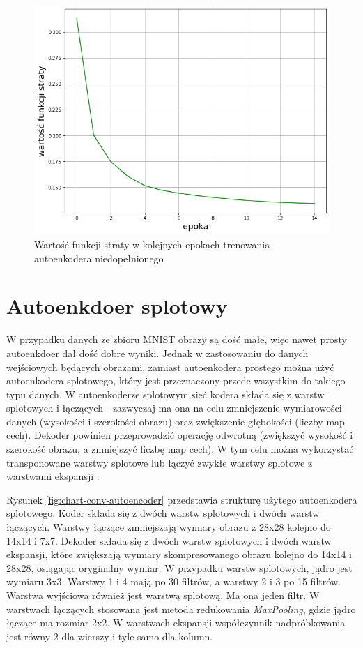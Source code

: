 \documentclass[12pt]{mwbk}
\theoremstyle{plain}
\theoremstyle{definition}
\theoremstyle{remark}
\newcommand\zrodlo[1]{\par\vspace{-3mm}{\small\textit{Źródło: }#1 }}
\begin{document}
\begin{figure}[!h]
	\centering
	\includegraphics[width=0.7\linewidth]{rys2/simple_loss.png}
	\caption{Wartość funkcji straty w kolejnych epokach trenowania autoenkodera niedopełnionego}
	\label{fig:simple-loss}
	\zrodlo{Opracowanie własne}
\end{figure}

\section{Autoenkdoer splotowy}

W przypadku danych ze zbioru MNIST obrazy są dość małe, więc nawet prosty autoenkdoer dał dość dobre wyniki.
Jednak w zastosowaniu do danych wejściowych będących obrazami, zamiast autoenkodera prostego można użyć autoenkodera splotowego, który jest przeznaczony przede wszystkim do takiego typu danych. W autoenkoderze splotowym sieć kodera składa się z warstw splotowych i łączących - zazwyczaj ma ona na celu zmniejszenie wymiarowości danych (wysokości i szerokości obrazu) oraz zwiększenie głębokości (liczby map cech). Dekoder powinien przeprowadzić operację odwrotną (zwiększyć wysokość i szerokość obrazu, a zmniejszyć liczbę map cech). W tym celu można wykorzystać transponowane warstwy splotowe lub łączyć zwykłe warstwy splotowe z warstwami ekspansji \cite{geron}.

Rysunek \ref{fig:chart-conv-autoencoder} przedstawia strukturę użytego autoenkodera splotowego. Koder składa się z dwóch warstw splotowych i dwóch warstw łączących. Warstwy łączące zmniejszają wymiary obrazu z 28x28 kolejno do 14x14 i 7x7. Dekoder składa się z dwóch warstw splotowych i dwóch warstw ekspansji, które zwiększają wymiary skompresowanego obrazu kolejno do 14x14 i 28x28, osiągając oryginalny wymiar. W przypadku warstw splotowych, jądro jest wymiaru 3x3. Warstwy 1 i 4 mają po 30 filtrów, a warstwy 2 i 3 po 15 filtrów. Warstwa wyjściowa również jest warstwą splotową. Ma ona jeden filtr. W warstwach łączących stosowana jest metoda redukowania \emph{MaxPooling}, gdzie jądro łączące ma rozmiar 2x2. W warstwach ekspansji współczynnik nadpróbkowania  jest równy 2 dla wierszy i tyle samo dla kolumn.
\end{document}

